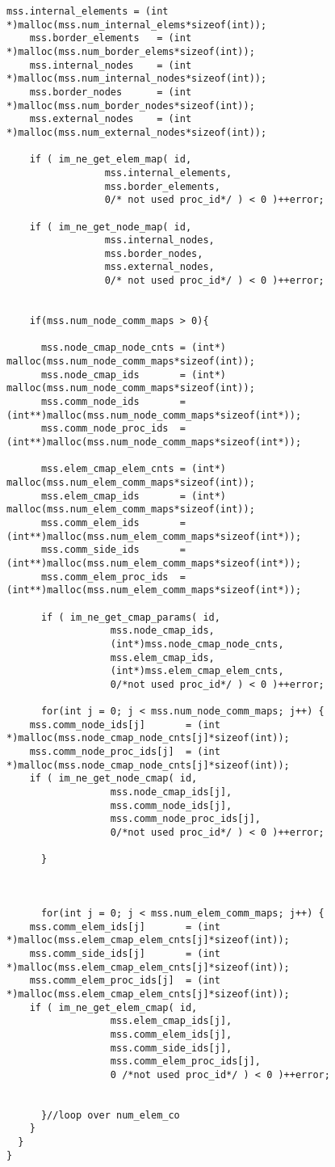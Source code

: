 \begin{Verbatim}[fontsize=\small]
    mss.internal_elements = (int *)malloc(mss.num_internal_elems*sizeof(int));
    mss.border_elements   = (int *)malloc(mss.num_border_elems*sizeof(int));
    mss.internal_nodes    = (int *)malloc(mss.num_internal_nodes*sizeof(int));
    mss.border_nodes      = (int *)malloc(mss.num_border_nodes*sizeof(int));
    mss.external_nodes    = (int *)malloc(mss.num_external_nodes*sizeof(int));
   
    if ( im_ne_get_elem_map( id, 
			     mss.internal_elements, 
			     mss.border_elements, 
			     0/* not used proc_id*/ ) < 0 )++error;
    
    if ( im_ne_get_node_map( id, 
			     mss.internal_nodes, 
			     mss.border_nodes,
			     mss.external_nodes, 
			     0/* not used proc_id*/ ) < 0 )++error;


    if(mss.num_node_comm_maps > 0){

      mss.node_cmap_node_cnts = (int*) malloc(mss.num_node_comm_maps*sizeof(int));
      mss.node_cmap_ids       = (int*) malloc(mss.num_node_comm_maps*sizeof(int));
      mss.comm_node_ids       = (int**)malloc(mss.num_node_comm_maps*sizeof(int*));
      mss.comm_node_proc_ids  = (int**)malloc(mss.num_node_comm_maps*sizeof(int*));

      mss.elem_cmap_elem_cnts = (int*) malloc(mss.num_elem_comm_maps*sizeof(int));
      mss.elem_cmap_ids       = (int*) malloc(mss.num_elem_comm_maps*sizeof(int));
      mss.comm_elem_ids       = (int**)malloc(mss.num_elem_comm_maps*sizeof(int*));
      mss.comm_side_ids       = (int**)malloc(mss.num_elem_comm_maps*sizeof(int*));
      mss.comm_elem_proc_ids  = (int**)malloc(mss.num_elem_comm_maps*sizeof(int*));

      if ( im_ne_get_cmap_params( id, 
				  mss.node_cmap_ids,
				  (int*)mss.node_cmap_node_cnts, 
				  mss.elem_cmap_ids,
				  (int*)mss.elem_cmap_elem_cnts, 
				  0/*not used proc_id*/ ) < 0 )++error;
      
      for(int j = 0; j < mss.num_node_comm_maps; j++) {
	mss.comm_node_ids[j]       = (int *)malloc(mss.node_cmap_node_cnts[j]*sizeof(int));
	mss.comm_node_proc_ids[j]  = (int *)malloc(mss.node_cmap_node_cnts[j]*sizeof(int));
	if ( im_ne_get_node_cmap( id, 
				  mss.node_cmap_ids[j], 
				  mss.comm_node_ids[j], 
				  mss.comm_node_proc_ids[j],
				  0/*not used proc_id*/ ) < 0 )++error;
	
      }
      
      
      
      for(int j = 0; j < mss.num_elem_comm_maps; j++) {
	mss.comm_elem_ids[j]       = (int *)malloc(mss.elem_cmap_elem_cnts[j]*sizeof(int));
	mss.comm_side_ids[j]       = (int *)malloc(mss.elem_cmap_elem_cnts[j]*sizeof(int));
	mss.comm_elem_proc_ids[j]  = (int *)malloc(mss.elem_cmap_elem_cnts[j]*sizeof(int));
	if ( im_ne_get_elem_cmap( id, 
				  mss.elem_cmap_ids[j], 
				  mss.comm_elem_ids[j], 
				  mss.comm_side_ids[j],
				  mss.comm_elem_proc_ids[j],
				  0 /*not used proc_id*/ ) < 0 )++error;
	

      }//loop over num_elem_co
    }
  }
}
\end{Verbatim}
